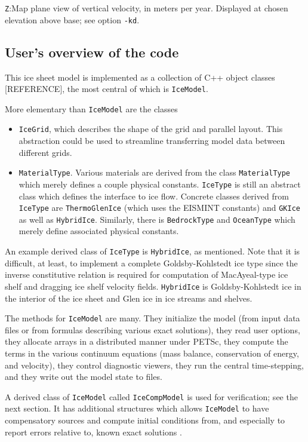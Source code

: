 \documentclass[11pt,final]{amsart}
\renewcommand{\t}[1]{\texttt{#1}}
\begin{document}
\verb|Z|:\quad Map plane view of vertical velocity, in meters per year.  Displayed at chosen elevation above base; see option \verb|-kd|.

\subsection{User's overview of the code}  This ice sheet model is implemented as a collection of C++ object classes [REFERENCE], the most central of which is \t{IceModel}.

More elementary than \t{IceModel} are the classes\begin{itemize}
\item \t{IceGrid}, which describes the shape of the grid and parallel
layout. This abstraction could be used to streamline transferring model data between
different grids.
\item \t{MaterialType}.  Various materials are derived from the class \t{MaterialType} which merely defines a couple
physical constants. \t{IceType} is still an abstract class which defines the interface to
ice flow. Concrete classes derived from \t{IceType} are \t{ThermoGlenIce} (which uses the
EISMINT constants) and \t{GKIce} as well as \t{HybridIce}.  Similarly, there is \t{BedrockType} and \t{OceanType} which merely define
associated physical constants.\end{itemize}

An example derived class of \t{IceType} is \t{HybridIce}, as mentioned.  Note that it is difficult, at least, to implement a complete Goldsby-Kohlstedt ice type \cite{GoldsbyKohlstedt} since the inverse constitutive
relation is required for computation of MacAyeal-type ice shelf and dragging ice shelf \cite{MacAyeal} velocity fields. \t{HybridIce} is Goldsby-Kohlstedt ice in the interior of the ice sheet and Glen ice in ice streams and
shelves.

The methods for \t{IceModel} are many.  They initialize the model (from input data files or from formulas describing various exact solutions), they read user options, they allocate arrays in a distributed manner under PETSc, they compute the terms in the various continuum equations (mass balance, conservation of energy, and velocity), they control diagnostic viewers, they run the central time-stepping, and they write out the model state to files.

A derived class of \t{IceModel} called \t{IceCompModel} is used for verification; see the next section.  It has additional structures which allows \t{IceModel} to have compensatory sources and compute initial conditions from, and especially to report errors relative to, known exact solutions \cite{BLKCB,BKL,BK}.
\end{document}
